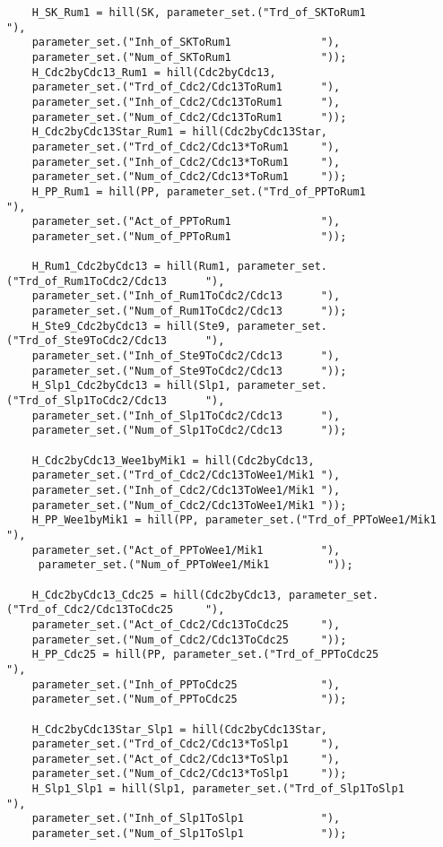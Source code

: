 \documentclass{article}
\begin{document}
\begin{verbatim}
    H_SK_Rum1 = hill(SK, parameter_set.("Trd_of_SKToRum1              "), 
    parameter_set.("Inh_of_SKToRum1              "), 
    parameter_set.("Num_of_SKToRum1              "));
    H_Cdc2byCdc13_Rum1 = hill(Cdc2byCdc13, 
    parameter_set.("Trd_of_Cdc2/Cdc13ToRum1      "), 
    parameter_set.("Inh_of_Cdc2/Cdc13ToRum1      "), 
    parameter_set.("Num_of_Cdc2/Cdc13ToRum1      "));
    H_Cdc2byCdc13Star_Rum1 = hill(Cdc2byCdc13Star, 
    parameter_set.("Trd_of_Cdc2/Cdc13*ToRum1     "), 
    parameter_set.("Inh_of_Cdc2/Cdc13*ToRum1     "), 
    parameter_set.("Num_of_Cdc2/Cdc13*ToRum1     "));
    H_PP_Rum1 = hill(PP, parameter_set.("Trd_of_PPToRum1              "), 
    parameter_set.("Act_of_PPToRum1              "), 
    parameter_set.("Num_of_PPToRum1              "));
    
    H_Rum1_Cdc2byCdc13 = hill(Rum1, parameter_set.("Trd_of_Rum1ToCdc2/Cdc13      "), 
    parameter_set.("Inh_of_Rum1ToCdc2/Cdc13      "), 
    parameter_set.("Num_of_Rum1ToCdc2/Cdc13      "));
    H_Ste9_Cdc2byCdc13 = hill(Ste9, parameter_set.("Trd_of_Ste9ToCdc2/Cdc13      "), 
    parameter_set.("Inh_of_Ste9ToCdc2/Cdc13      "), 
    parameter_set.("Num_of_Ste9ToCdc2/Cdc13      "));
    H_Slp1_Cdc2byCdc13 = hill(Slp1, parameter_set.("Trd_of_Slp1ToCdc2/Cdc13      "), 
    parameter_set.("Inh_of_Slp1ToCdc2/Cdc13      "), 
    parameter_set.("Num_of_Slp1ToCdc2/Cdc13      "));
    
    H_Cdc2byCdc13_Wee1byMik1 = hill(Cdc2byCdc13, 
    parameter_set.("Trd_of_Cdc2/Cdc13ToWee1/Mik1 "), 
    parameter_set.("Inh_of_Cdc2/Cdc13ToWee1/Mik1 "), 
    parameter_set.("Num_of_Cdc2/Cdc13ToWee1/Mik1 "));
    H_PP_Wee1byMik1 = hill(PP, parameter_set.("Trd_of_PPToWee1/Mik1         "), 
    parameter_set.("Act_of_PPToWee1/Mik1         "),
     parameter_set.("Num_of_PPToWee1/Mik1         "));
    
    H_Cdc2byCdc13_Cdc25 = hill(Cdc2byCdc13, parameter_set.("Trd_of_Cdc2/Cdc13ToCdc25     "), 
    parameter_set.("Act_of_Cdc2/Cdc13ToCdc25     "), 
    parameter_set.("Num_of_Cdc2/Cdc13ToCdc25     "));
    H_PP_Cdc25 = hill(PP, parameter_set.("Trd_of_PPToCdc25             "), 
    parameter_set.("Inh_of_PPToCdc25             "), 
    parameter_set.("Num_of_PPToCdc25             "));
    
    H_Cdc2byCdc13Star_Slp1 = hill(Cdc2byCdc13Star, 
    parameter_set.("Trd_of_Cdc2/Cdc13*ToSlp1     "), 
    parameter_set.("Act_of_Cdc2/Cdc13*ToSlp1     "), 
    parameter_set.("Num_of_Cdc2/Cdc13*ToSlp1     "));
    H_Slp1_Slp1 = hill(Slp1, parameter_set.("Trd_of_Slp1ToSlp1            "), 
    parameter_set.("Inh_of_Slp1ToSlp1            "), 
    parameter_set.("Num_of_Slp1ToSlp1            "));
    

\end{verbatim}
\end{document}
